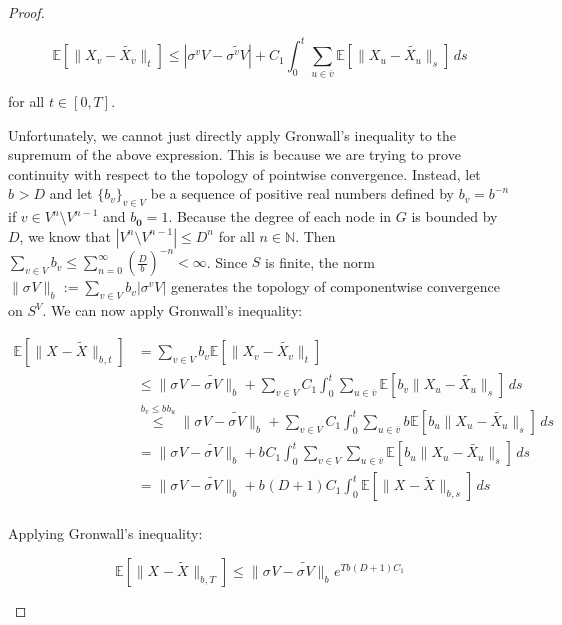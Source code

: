 \documentclass[12pt]{article}
\newcommand{\mb}{\mathbb}
\newcommand{\ov}{\overline}
\newcommand{\os}{\overset}
\newcommand{\ind}{\hspace{24pt}}
\newcommand{\ex}[1]{\mb{E}\left[#1\right]}			%
\renewcommand{\root}{\mathbf{0}}				%
\renewcommand{\v}{v}							%
\newcommand{\vv}{u}								%
\newcommand{\cl}{\ov}							%
\renewcommand{\S}{S}							%
\newcommand{\s}{\sigma}							%
\newcommand{\sv}[1]{\s^{#1}}					%
\renewcommand{\b}[1]{b_{#1}}					%
\newcommand{\T}{T}								%
\renewcommand{\t}{t}							%
\newcommand{\degr}{D}								%
\newcommand{\pup}[1]{^{#1}}							%
\renewcommand{\G}{G}								%
\newcommand{\V}{V}									%
\renewcommand{\tt}{s}								%
\newcommand{\numb}{n}								%
\newcommand{\XState}[1]{\S^{#1}}				%
\newcommand{\rxvts}[2]{X_{#1}{#2}}					%
\newcommand{\const}[1]{C_{#1}}						%
\newcommand{\alt}{\widetilde}						%
\begin{document}
\begin{proof}
\begin{enumerate}[(a)]
\[\ex{\|\rxvts{\v}{} - \alt{\rxvts{\v}{}}\|_\t} \leq |\sv{\v}{\V} - \alt{\sv{\v}{\V}}| + \const{1}\int_0^\t \sum_{\vv\in \cl{\v}} \ex{\|\rxvts{\vv}{} - \alt{\rxvts{\vv}{}}\|_\tt}\,d\tt\]

for all \(\t \in [0,\T]\).

\ind Unfortunately, we cannot just directly apply Gronwall's inequality to the supremum of the above expression. This is because we are trying to prove continuity with respect to the topology of pointwise convergence. Instead, let \(\b{} > \degr\) and let \(\{\b{\v}\}_{\v \in \V}\) be a sequence of positive real numbers defined by \(\b{\v} = \b{}^{-\numb}\) if \(\v \in \V\pup{\numb}\setminus \V\pup{\numb-1}\) and \(\b{\root} = 1\). Because the degree of each node in \(\G\) is bounded by \(\degr\), we know that \(|\V\pup{\numb}\setminus \V\pup{\numb-1}| \leq \degr^{\numb}\) for all \(\numb\in \mb{N}\). Then \(\sum_{\v \in \V} \b{\v} \leq \sum_{\numb=0}^\infty \left(\frac{\degr}{\b{}}\right)^{-\numb} < \infty\). Since \(\S\) is finite, the norm \(\|\sv{}{\V}\|_{\b{}} := \sum_{\v \in \V} \b{\v}|\sv{\v}{\V}|\) generates the topology of componentwise convergence on \(\S^\V\). We can now apply Gronwall's inequality:

\begin{align*}
\ex{\|\rxvts{}{} - \alt{\rxvts{}{}}\|_{\b{},\t}} &= \sum_{\v \in \V} \b{\v}\ex{\|\rxvts{\v}{} - \alt{\rxvts{\v}{}}\|_\t}\\
&\leq \|\sv{}{\V} - \alt{\sv{}{\V}}\|_{\b{}} + \sum_{\v \in \V}\const{1}\int_0^\t \sum_{\vv \in \cl{\v}} \ex{\b{\v}\|\rxvts{\vv}{} - \alt{\rxvts{\vv}{}}\|_\tt}\,d\tt\\
&\os{\b{\v}\leq \b{}\b{\vv}}{\leq} \|\sv{}{\V} - \alt{\sv{}{\V}}\|_{\b{}} + \sum_{\v \in \V}\const{1}\int_0^\t \sum_{\vv \in \cl{\v}} \b{}\ex{\b{\vv}\|\rxvts{\vv}{} - \alt{\rxvts{\vv}{}}\|_\tt}\,d\tt\\
&= \|\sv{}{\V} - \alt{\sv{}{\V}}\|_{\b{}} + \b{}\const{1}\int_0^\t \sum_{\v \in \V}\sum_{\vv \in \cl{\v}} \ex{\b{\vv}\|\rxvts{\vv}{} - \alt{\rxvts{\vv}{}}\|_\tt}\,d\tt\\
&=\|\sv{}{\V} - \alt{\sv{}{\V}}\|_{\b{}} + \b{}(\degr+1)\const{1}\int_0^\t \ex{\|\rxvts{}{} - \alt{\rxvts{}{}}\|_{\b{},\tt}}\,d\tt\\
\end{align*}

Applying Gronwall's inequality:

\[\ex{\|\rxvts{}{} - \alt{\rxvts{}{}}\|_{\b{},\T}} \leq \|\sv{}{\V} - \alt{\sv{}{\V}}\|_{\b{}}e^{\T\b{}(\degr+1)\const{1}}\]


\end{enumerate}
\end{proof}
\end{document}
